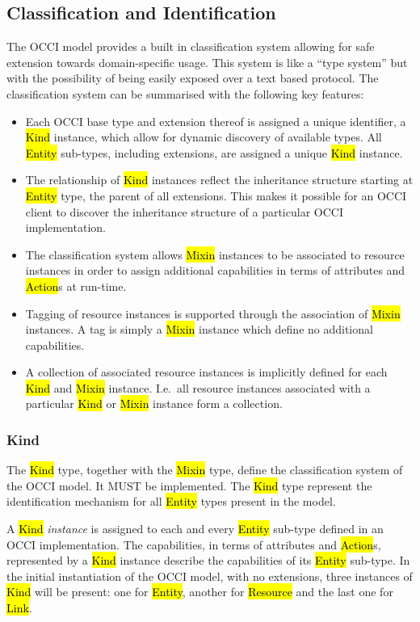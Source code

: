 \documentclass[10pt,a4paper,british]{article}
\begin{document}
\subsection{Classification and Identification}
\label{sec:classification}
The OCCI model provides a built in classification system allowing for safe
extension towards domain-specific usage. This system is like a ``type system''
but with the possibility of being easily exposed over a text based protocol.
%
The classification system can be summarised with the following key features:
\begin{itemize}
\item Each OCCI base type and extension thereof is assigned a unique
 identifier, a \hl{Kind} instance, which allow for dynamic discovery of
 available types. All \hl{Entity} sub-types, including extensions, are assigned
 a unique \hl{Kind} instance.
\item The relationship of \hl{Kind} instances reflect the inheritance structure
 starting at \hl{Entity} type, the parent of all extensions. This makes it
 possible for an OCCI client to discover the inheritance structure of a
 particular OCCI implementation.
\item The classification system allows \hl{Mixin} instances to be associated
 to resource instances in order to assign additional capabilities in terms of
 attributes and \hl{Action}s at run-time.
\item Tagging of resource instances is supported through the association
 of \hl{Mixin} instances. A tag is simply a \hl{Mixin} instance which define no
 additional capabilities.
\item A collection of associated resource instances is implicitly defined for
 each \hl{Kind} and \hl{Mixin} instance. I.e.~all resource instances associated
 with a particular \hl{Kind} or \hl{Mixin} instance form a collection.
\end{itemize}

\subsubsection{Kind}
\label{sec:kind}
The \hl{Kind} type, together with the \hl{Mixin} type, define the
classification system of the OCCI model. It MUST be implemented. The \hl{Kind}
type represent the identification mechanism for all \hl{Entity} types present in
the model.

A \hl{Kind} {\em instance} is assigned to each and every \hl{Entity} sub-type
defined in an OCCI implementation. The capabilities, in terms of attributes and
\hl{Action}s, represented by a \hl{Kind} instance describe the capabilities of
its \hl{Entity} sub-type.
%
In the initial instantiation of the OCCI model, with no extensions, three instances
of \hl{Kind} will be present: one for \hl{Entity}, another for \hl{Resource}
and the last one for \hl{Link}. 
\end{document}
